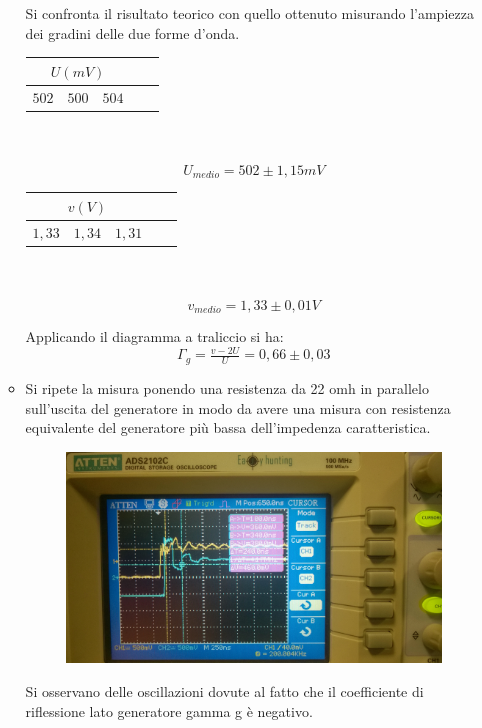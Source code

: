 \documentclass[a4paper]{article}
\begin{document}
\begin{itemize}
\begin{itemize}
Si confronta il risultato teorico con quello ottenuto misurando l’ampiezza dei gradini delle due forme d’onda.
\begin{center}
 \begin{tabular}{|r|l|l|l|l|}
     \hline
     \multicolumn{3}{|c|}{\(U (mV)\)} \\
     \hline
     \(502\) & \(500\) & \(504\)\\
     \hline
   \end{tabular} \\ \\
\[U_{medio}=502 \pm 1,15 mV\]

\begin{tabular}{|r|l|l|l|l|}
     \hline
     \multicolumn{3}{|c|}{\(v (V)\)} \\
     \hline
     \(1,33\) & \(1,34\) & \(1,31\)\\
     \hline
   \end{tabular} \\ \\
\[v_{medio}=1,33 \pm 0,01 V\]
\end{center}
Applicando il diagramma a traliccio si ha:
\[\Gamma_g = \tfrac{v-2U}{U} = 0,66 \pm 0,03 \]
\item Si ripete la misura ponendo una resistenza da 22 omh in parallelo sull’uscita del generatore in modo da avere una misura con resistenza equivalente del generatore più bassa dell’impedenza caratteristica.

\begin{figure}[h]
\centering
\includegraphics[scale=0.07]{foto/foto15.jpg}
\end{figure}

Si osservano delle oscillazioni dovute al fatto che il coefficiente di riflessione lato generatore gamma g è negativo.


\end{itemize}
\end{itemize}
\end{document}
